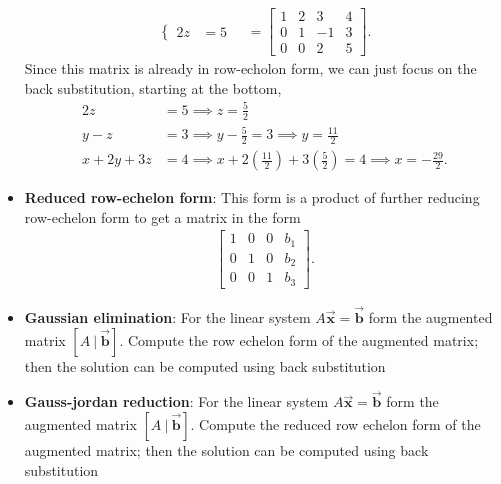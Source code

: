 \documentclass{report}
\begin{document}
\begin{itemize}
\begin{align*}
\begin{cases}
                                2z &= 5
                            \end{cases} \quad = 
                    \left[\begin{array}{ccc|c}
                            1 & 2 & 3 & 4 \\
                            0 & 1 & -1 & 3 \\
                            0 & 0 & 2 & 5
                    \end{array}\right]
                .\end{align*}
                \bigbreak \noindent 
                Since this matrix is already in row-echolon form, we can just focus on the back substitution, starting at the bottom,
                \begin{align*}
                    2z &= 5 \implies z = \frac{5}{2}         \\
                    y - z &= 3 \implies y - \frac{5}{2} = 3 \implies y = \frac{11}{2} \\
                    x + 2y + 3z &= 4 \implies x + 2\left(\frac{11}{2}\right)  + 3 \left(\frac{5}{2}\right) = 4 \implies x = -\frac{29}{2}
                .\end{align*}
            \item \textbf{Reduced row-echelon form}: This form is a product of further reducing row-echelon form to get a matrix in the form
                \begin{align*}
                    \left[
                        \begin{array}{ccc|c}
                            1 & 0 & 0 & b_{1} \\
                            0 & 1 & 0 & b_{2} \\
                            0 & 0 & 1 & b_{3}
                        \end{array}
                    \right]
                .\end{align*}
            \item \textbf{Gaussian elimination}:  For the linear system $A\vec{\mathbf{x}} = \vec{\mathbf{b}}$ form the augmented matrix $[A\ |\ \vec{\mathbf{b}}]$. Compute the row echelon form of the augmented matrix; then the solution can be computed using back substitution
            \item \textbf{Gauss-jordan reduction}:  For the linear system $A\vec{\mathbf{x}} = \vec{\mathbf{b}}$ form the augmented matrix $[A\ |\ \vec{\mathbf{b}}]$. Compute the reduced row echelon form of the augmented matrix; then the solution can be computed using back substitution

\end{itemize}
\end{document}
